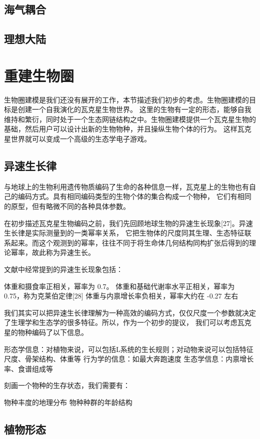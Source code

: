 \documentclass[a4paper,10.5pt]{article}
\begin{document}
\subsection{海气耦合}

\subsection{理想大陆}

\section{重建生物圈}

生物圈建模是我们还没有展开的工作，本节描述我们初步的考虑。生物圈建模的目标是创建一个自我演化的瓦克星生物世界。
这里的生物有一定的形态，能够自我维持和繁衍，同时处于一个生态网链结构之中。生物圈建模提供一个瓦克星生物的基础，然后用户可以设计出新的生物物种，并且操纵生物个体的行为。
这样瓦克星世界就可以变成一个高级的生态学电子游戏。

\subsection{异速生长律}

与地球上的生物利用遗传物质编码了生命的各种信息一样，瓦克星上的生物也有自己的编码方式。具有相同编码类型的生物个体的集合构成一个物种，
它们有相同的原型，但有略微不同的各种具体参数。

在初步描述瓦克星生物编码之前，我们先回顾地球生物的异速生长现象[27]。异速生长律是实际测量到的一类幂率关系，
它把生物体的尺度同其生理、生态特征联系起来。而这个观测到的幂率，往往不同于将生命体几何结构同构扩张后得到的理论幂率，故此称为异速生长。

文献中经常提到的异速生长现象包括：

体重和摄食率正相关，幂率为 0.7。
体重和基础代谢率水平正相关，幂率为 0.75，称为克莱伯定律[28]
体重与内禀增长率负相关，幂率大约在 -0.27 左右

我们其实可以把异速生长律理解为一种高效的编码方式，仅仅尺度一个参数就决定了生理学和生态学的很多特征。所以，作为一个初步的提议，
我们可以考虑瓦克星的物种编码了以下信息。

形态学信息：对植物来说，可以包括L系统的生长规则；对动物来说可以包括特征尺度、骨架结构、体重等
行为学的信息：如最大奔跑速度
生态学信息：内禀增长率、食谱组成等

刻画一个物种的生存状态，我们需要有：

物种丰度的地理分布
物种种群的年龄结构

\subsection{植物形态}
\end{document}
